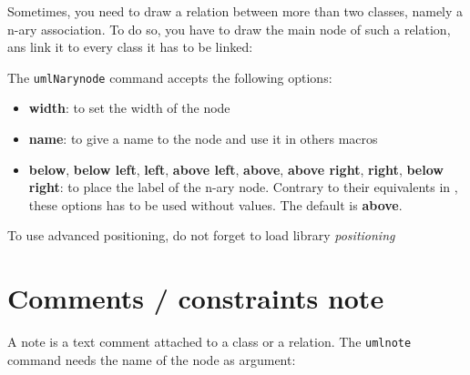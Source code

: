 \documentclass[a4paper,11pt]{report}
\begin{document}
Sometimes, you need to draw a relation between more than two classes, namely a n-ary association. To do so, you have to draw the main node of such a relation, ans link it to every class it has to be linked:

\medskip

\begin{minipage}{0.5\textwidth}
	
\end{minipage}
\begin{minipage}{0.4\textwidth}
	\begin{center}
	\end{center}
\end{minipage}

\medskip

The {\tt umlNarynode} command accepts the following options:

\begin{itemize}
	\item {\bf width}: to set the width of the node
	\item {\bf name}: to give a name to the node and use it in others macros
	\item {\bf below}, {\bf below left}, {\bf left}, {\bf above left}, {\bf above}, {\bf above right}, {\bf right}, {\bf below right}: to place the label of the n-ary node. Contrary to their equivalents in \TikZ, these options has to be used without values. The default is {\bf above}.
\end{itemize}

\begin{remark}
	To use advanced positioning, do not forget to load \TikZ library {\em positioning}
\end{remark}

\section{Comments / constraints note}\label{s.note}

A note is a text comment attached to a class or a relation. The {\tt umlnote} command needs the name of the node as argument:

\medskip

\begin{minipage}{0.5\textwidth}
	
\end{minipage}
\begin{minipage}{0.4\textwidth}
	\begin{center}
	\end{center}
\end{minipage}
\end{document}
